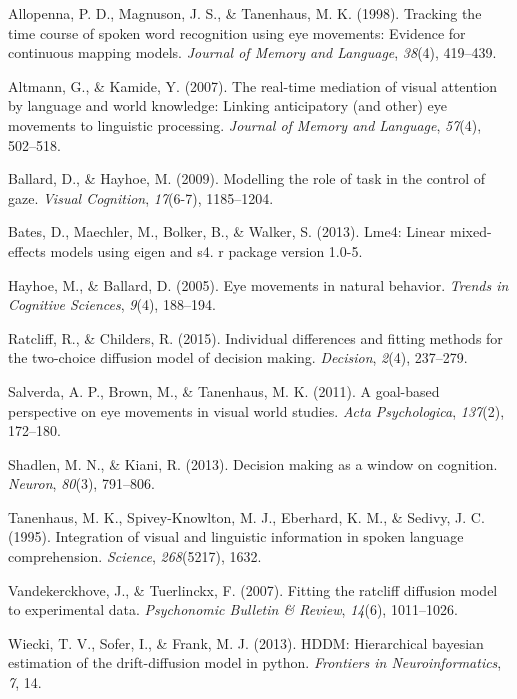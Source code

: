 \documentclass[10pt, letterpaper]{article}
\begin{document}
\setlength{\parindent}{-0.1in} \setlength{\leftskip}{0.125in} \noindent

\hypertarget{refs}{}
\hypertarget{ref-allopenna1998tracking}{}
Allopenna, P. D., Magnuson, J. S., \& Tanenhaus, M. K. (1998). Tracking
the time course of spoken word recognition using eye movements: Evidence
for continuous mapping models. \emph{Journal of Memory and Language},
\emph{38}(4), 419--439.

\hypertarget{ref-altmann2007real}{}
Altmann, G., \& Kamide, Y. (2007). The real-time mediation of visual
attention by language and world knowledge: Linking anticipatory (and
other) eye movements to linguistic processing. \emph{Journal of Memory
and Language}, \emph{57}(4), 502--518.

\hypertarget{ref-ballard2009modelling}{}
Ballard, D., \& Hayhoe, M. (2009). Modelling the role of task in the
control of gaze. \emph{Visual Cognition}, \emph{17}(6-7), 1185--1204.

\hypertarget{ref-bates2013lme4}{}
Bates, D., Maechler, M., Bolker, B., \& Walker, S. (2013). Lme4: Linear
mixed-effects models using eigen and s4. r package version 1.0-5.

\hypertarget{ref-hayhoe2005eye}{}
Hayhoe, M., \& Ballard, D. (2005). Eye movements in natural behavior.
\emph{Trends in Cognitive Sciences}, \emph{9}(4), 188--194.

\hypertarget{ref-ratcliff2015individual}{}
Ratcliff, R., \& Childers, R. (2015). Individual differences and fitting
methods for the two-choice diffusion model of decision making.
\emph{Decision}, \emph{2}(4), 237--279.

\hypertarget{ref-salverda2011goal}{}
Salverda, A. P., Brown, M., \& Tanenhaus, M. K. (2011). A goal-based
perspective on eye movements in visual world studies. \emph{Acta
Psychologica}, \emph{137}(2), 172--180.

\hypertarget{ref-shadlen2013decision}{}
Shadlen, M. N., \& Kiani, R. (2013). Decision making as a window on
cognition. \emph{Neuron}, \emph{80}(3), 791--806.

\hypertarget{ref-tanenhaus1995integration}{}
Tanenhaus, M. K., Spivey-Knowlton, M. J., Eberhard, K. M., \& Sedivy, J.
C. (1995). Integration of visual and linguistic information in spoken
language comprehension. \emph{Science}, \emph{268}(5217), 1632.

\hypertarget{ref-vandekerckhove2007fitting}{}
Vandekerckhove, J., \& Tuerlinckx, F. (2007). Fitting the ratcliff
diffusion model to experimental data. \emph{Psychonomic Bulletin \&
Review}, \emph{14}(6), 1011--1026.

\hypertarget{ref-wiecki2013hddm}{}
Wiecki, T. V., Sofer, I., \& Frank, M. J. (2013). HDDM: Hierarchical
bayesian estimation of the drift-diffusion model in python.
\emph{Frontiers in Neuroinformatics}, \emph{7}, 14.
\end{document}
